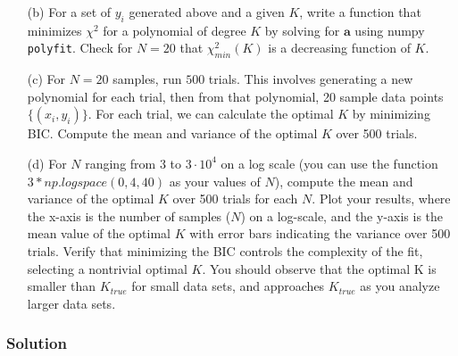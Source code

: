 \documentclass[submit]{harvardml}
\begin{document}
\begin{problem}
\begin{itemize}
        \item[(b)] For a set of $y_i$ generated above and a given $K$, write a function that minimizes $\chi^2$ for a polynomial of degree $K$ by solving for $\mathbf{a}$ using
                   numpy \texttt{polyfit}.                   Check for $N=20$ that $\chi^2_{min}(K)$ is a decreasing function of $K$.

        \item[(c)] For $N=20$ samples, run $500$ trials. This involves generating a new polynomial for each trial, then from that polynomial, 20 sample data points $\{(x_i,y_i)\}$. For each trial,
                          we can calculate the optimal $K$ by minimizing BIC. Compute the mean and variance of the optimal $K$ over 500 trials.

        \item[(d)] For $N$ ranging from $3$ to $3 \cdot 10^4$ on a log scale (you can use the function $3*np.logspace(0,4, 40)$ as your values of $N$),
                   compute the mean and variance of the optimal $K$ over 500 trials for each $N$. Plot your results, where the x-axis is the number of samples ($N$) on a log-scale,
                   and the y-axis is the mean value of the optimal $K$ with error bars indicating the variance over 500 trials. Verify that minimizing the BIC controls the complexity of the fit,
                   selecting a nontrivial optimal $K$. You should observe that the optimal K is smaller than $K_{true}$ for small data sets, and approaches $K_{true}$ as you
                   analyze larger data sets.

    \end{itemize}


\end{problem}

\subsubsection*{Solution}
\end{document}
